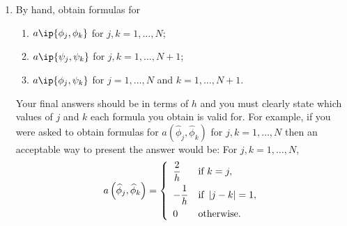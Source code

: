 \begin{enumerate}
\item By hand, obtain formulas for
\\
\begin{enumerate}
\item $a\ip{\phi_j,\phi_k}$ for $j,k=1,\ldots,N$;
\\
\item $a\ip{\psi_j,\psi_k}$ for $j,k=1,\ldots,N+1$;
\\
\item $a\ip{\phi_j,\psi_k}$ for $j=1,\ldots,N$ and $k=1,\ldots,N+1$.
\\
\end{enumerate}
Your final answers should be in terms of $h$ and you must clearly state which values of $j$ and $k$ each formula you obtain is valid for. For example, if you were asked to obtain formulas for $a\left(\widehat{\phi}_j,\widehat{\phi}_k\right)$ for $j,k=1,\ldots,N$ then an acceptable way to present the answer would be:\newline
For $j,k=1,\ldots,N$,
\[
a\left(\widehat{\phi}_j,\widehat{\phi}_k\right)=\left\{\begin{array}{ll}\displaystyle{{2 \over h}} & \mbox{if }k=j, \\[.75em] \displaystyle{-{1 \over h}} & \mbox{if }\left|j-k\right|=1, \\[.75em] \displaystyle{0} & \mbox{otherwise}.\end{array}\right.
\]
\end{enumerate}




